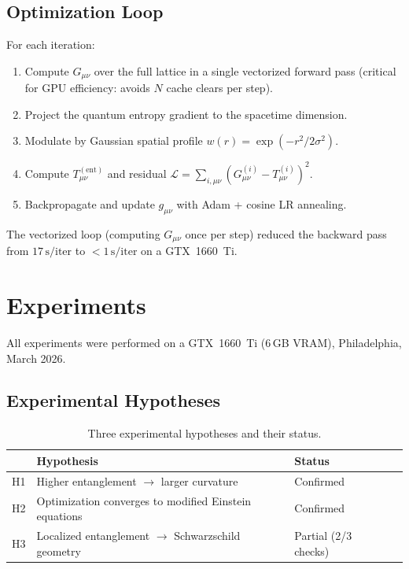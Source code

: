 \documentclass[12pt,a4paper]{article}
\newcommand{\Tent}{T^{(\mathrm{ent})}_{\mu\nu}}
\newcommand{\Gmn}{G_{\mu\nu}}
\newcommand{\gmn}{g_{\mu\nu}}
\begin{document}
\subsection{Optimization Loop}

For each iteration:
\begin{enumerate}
  \item Compute $\Gmn$ over the full lattice in a single vectorized forward
        pass (critical for GPU efficiency: avoids $N$ cache clears per step).
  \item Project the quantum entropy gradient to the spacetime dimension.
  \item Modulate by Gaussian spatial profile $w(r)=\exp(-r^2/2\sigma^2)$.
  \item Compute $\Tent$ and residual
        $\mathcal{L}=\sum_{i,\mu\nu}(G_{\mu\nu}^{(i)}-T_{\mu\nu}^{(i)})^2$.
  \item Backpropagate and update $\gmn$ with Adam + cosine LR annealing.
\end{enumerate}
%
The vectorized loop (computing $\Gmn$ once per step) reduced the backward
pass from $17\,\mathrm{s/iter}$ to ${<}1\,\mathrm{s/iter}$ on a GTX~1660~Ti.

\section{Experiments}

All experiments were performed on a GTX~1660~Ti (6\,GB VRAM),
Philadelphia, March 2026.

\subsection{Experimental Hypotheses}

\begin{table}[h]
\centering
\caption{Three experimental hypotheses and their status.}
\label{tab:hypotheses}
\begin{tabular}{clll}
\toprule
 & Hypothesis & Status \\
\midrule
H1 & Higher entanglement $\to$ larger curvature & Confirmed \\
H2 & Optimization converges to modified Einstein equations & Confirmed \\
H3 & Localized entanglement $\to$ Schwarzschild geometry & Partial (2/3 checks) \\
\bottomrule
\end{tabular}
\end{table}
\end{document}
